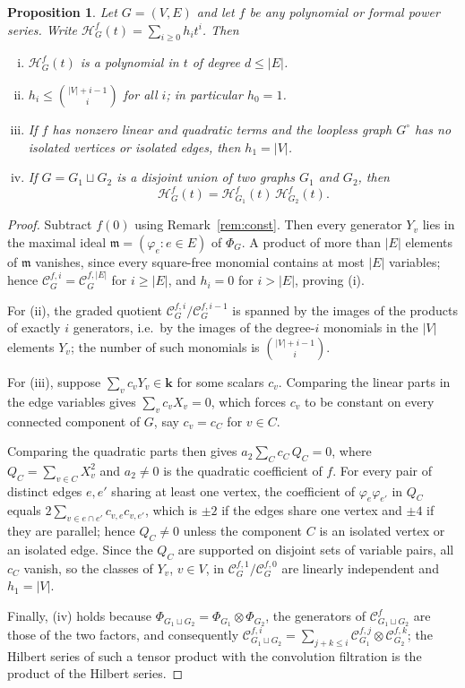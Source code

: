 \documentclass[reqno]{article}
\theoremstyle{plain} %
\newtheorem{proposition}[theorem]{Proposition}
\theoremstyle{definition}
\theoremstyle{remark}
\newcommand{\K} {\mathbf{k}}
\newcommand {\CC}{\mathscr{C}}
\newcommand{\hs}{\mathscr{H}}
\newcommand{\ds}{\displaystyle}
\numberwithin{equation}{section}
\begin{document}
\begin{proposition}
\label{prop:hilb}
Let $G=(V,E)$ and let $f$ be any polynomial or formal power series.
Write $\hs_G^f(t)=\sum_{i\ge0}h_it^i$.
Then
\begin{enumerate}[(i)]
\item $\hs_G^f(t)$ is a polynomial in $t$ of degree $d\le |E|$.
\item $\ds h_i\le \binom{|V|+i-1}{i}$ for all $i$; in particular $h_0=1$.
\item If $f$ has nonzero linear and quadratic terms and the loopless graph $G^\circ$ has no isolated vertices or isolated edges, then $h_1=|V|$.
\item If $G=G_1\sqcup G_2$ is a disjoint union of two graphs $G_1$ and $G_2$, then
  \begin{equation}
    \label{eq:factor}
    \hs_G^f(t)=\hs_{G_1}^f(t)\,\hs_{G_2}^f(t).
  \end{equation}
\end{enumerate}
\end{proposition}
 \begin{proof}
Subtract $f(0)$ using Remark~\ref{rem:const}. Then every generator $Y_v$ lies in the maximal ideal $\mathfrak m=(\varphi_e: e\in E)$ of $\Phi_G$.  A product of more than $|E|$ elements of $\mathfrak m$ vanishes, since every square-free monomial contains at most $|E|$ variables; hence $\CC^{f,i}_G=\CC^{f,|E|}_G$ for $i\ge|E|$, and $h_i=0$ for $i>|E|$, proving (i).

For (ii), the graded quotient $\CC^{f,i}_G/\CC^{f,i-1}_G$ is spanned by the images of the products of exactly $i$ generators, i.e.\ by the images of the degree-$i$ monomials in the $|V|$ elements $Y_v$; the number of such monomials is $\binom{|V|+i-1}{i}$.

For (iii), suppose $\sum_v c_vY_v\in\K$ for some scalars $c_v$.  Comparing the linear parts in the edge variables gives $\sum_vc_vX_v=0$, which forces $c_v$ to be constant on every connected component of $G$, say $c_v=c_C$ for $v\in C$.

Comparing the quadratic parts then gives $a_2\sum_C c_C\,Q_C=0$, where $Q_C=\sum_{v\in C}X_v^2$ and $a_2\ne0$ is the quadratic coefficient of $f$.  For every pair of distinct edges $e,e'$ sharing at least one vertex, the coefficient of $\varphi_e\varphi_{e'}$ in $Q_C$ equals $2\sum_{v\in e\cap e'}c_{v,e}c_{v,e'}$, which is $\pm2$ if the edges share one vertex and $\pm4$ if they are parallel; hence $Q_C\ne0$ unless the component $C$ is an isolated vertex or an isolated edge.  Since the $Q_C$ are supported on disjoint sets of variable pairs, all $c_C$ vanish, so the classes of $Y_v$, $v\in V$, in $\CC^{f,1}_G/\CC^{f,0}_G$ are linearly independent and $h_1=|V|$.

Finally, (iv) holds because $\Phi_{G_1\sqcup G_2}=\Phi_{G_1}\otimes\Phi_{G_2}$, the generators of $\CC^f_{G_1\sqcup G_2}$ are those of the two factors, and consequently $\CC^{f,i}_{G_1\sqcup G_2}=\sum_{j+k\le i}\CC^{f,j}_{G_1}\otimes\CC^{f,k}_{G_2}$; the Hilbert series of such a tensor product with the convolution filtration is the product of the Hilbert series.
 \end{proof}
\end{document}
